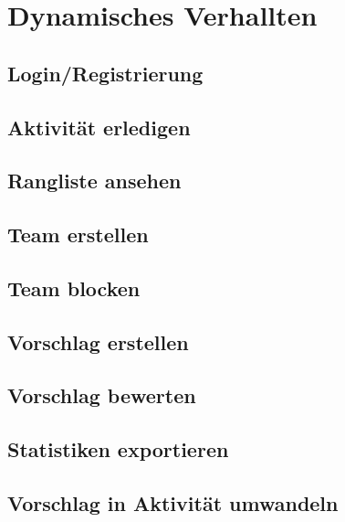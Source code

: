 \section{Dynamisches Verhallten}
\subsection{Login/Registrierung}
\subsection{Aktivität erledigen}
\subsection{Rangliste ansehen}
\subsection{Team erstellen}
\subsection{Team blocken}
\subsection{Vorschlag erstellen}
\subsection{Vorschlag bewerten}
\subsection{Statistiken exportieren}
\subsection{Vorschlag in Aktivität umwandeln}
